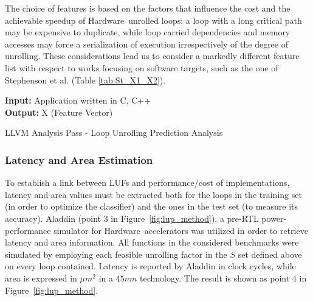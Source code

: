 \documentclass[]{usiinfthesis}
\newcommand{\HW}{{Hardware}}
\begin{document}
The choice of features is based on the factors that influence the cost
and the achievable speedup of \HW\ unrolled loops: a loop with a
long critical path may be expensive to duplicate, while loop carried
dependencies and memory accesses may force a serialization of
execution irrespectively of the degree of unrolling. These
considerations lead us to consider a markedly different feature list
with respect to works focusing on software targets, such as the one of
Stephenson et al. (Table \ref{tab:St_X1_X2}).\par

\begin{algorithm}[t]
\begin{flushleft}
\textbf{Input:}  Application written in C, C++\\
\textbf{Output:} X (Feature Vector)\\
\end{flushleft}
\begin{algorithmic}[1]
 { }
     {}
    \EndIf
  \EndFor
\EndFunction
\State
{}
   {}
   {}
\EndFunction
\end{algorithmic}
\caption{LLVM Analysis Pass - Loop Unrolling Prediction Analysis} 
\label{Algo_LLVM}

\end{algorithm}

\subsubsection{Latency and Area Estimation}
\label{sec:ml_la}

To establish a link between LUFs and performance/cost of
implementations, latency and area values must be extracted both for
the loops in the training set (in order to optimize the classifier)
and the ones in the test set (to measure its accuracy).%
Aladdin \cite{ShaoJul14} (point 3 in
Figure~\ref{fig:lup_method}), a pre-RTL power-performance simulator
for \HW\ accelerators was utilized in order to retrieve latency and area 
information. All functions in the considered benchmarks were
simulated by employing each feasible unrolling factor in the $S$ set 
defined above on every loop contained.  
Latency is reported by Aladdin in clock cycles,
while area is expressed in $\mu m^2$ in a $45nm$ technology. The
result is shown as point 4 in Figure~\ref{fig:lup_method}.
\par
\end{document}
